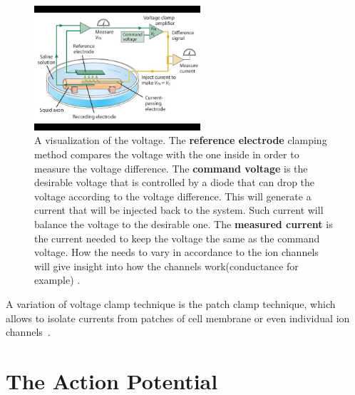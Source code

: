 \documentclass[class={myRUCProject}, crop=false]{standalone}
\begin{document}
\begin{figure}[H]
    \centering
    \includegraphics[trim=0 25 0 25,clip,width=0.55\textwidth]{Pictures/Ana/clamp.png}
    \caption{A visualization of the voltage. The \textbf{reference electrode} clamping method compares the voltage with the one inside in order to measure the voltage difference. The \textbf{command voltage} is the desirable voltage that is controlled by a diode that can drop the voltage according to the voltage difference. This will generate a current that will be injected back to the system. Such current will balance the voltage to the desirable one. The \textbf{measured current} is the current needed to keep the voltage the same as the command voltage. How the needs to vary in accordance to the ion channels will give insight into how the channels work(conductance for example) \cite{Purves}.}
\end{figure} 




A variation of voltage clamp technique is the patch clamp technique, which allows to isolate currents from patches of cell membrane or even individual ion channels~\cite{Hammond2015ch4}.

\section{The Action Potential}\label{sec:ap}
\end{document}
